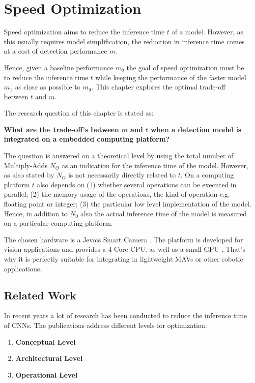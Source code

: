 \chapter{Speed Optimization}
\label{sec:tradeoff}

Speed optimization aims to reduce the inference time $t$ of a model. However, as this usually requires model simplification, the reduction in inference time comes at a cost of detection performance $m$.

Hence, given a baseline performance $m_0$ the goal of speed optimization must be to reduce the inference time $t$ while keeping the performance of the faster model $m_1$ as close as possible to $m_0$. This chapter explores the optimal trade-off between $t$ and $m$.


The research question of this chapter is stated as:

\begin{center}
	\textbf{What are the trade-off's between $m$ and $t$ when a detection model is integrated on a embedded computing platform?}
\end{center}

The question is answered on a theoretical level by using the total number of \ac{Multiply-Adds} $N_O$ as an indication for the inference time of the model. However, as also stated by  $N_O$ is not necessarily directly related to $t$. On a computing platform $t$ also depends on (1) whether several operations can be executed in parallel; (2) the memory usage of the operations, the kind of operation e.g. floating point or integer; (3) the particular low level implementation of the model. Hence, in addition to $N_0$ also the actual inference time of the model is measured on a particular computing platform.

The chosen hardware is a Jevois Smart Camera . The platform is developed for vision applications and provides a 4 Core CPU, as well as a small GPU . That's why it is perfectly suitable for integrating in lightweight \acp{MAV} or other robotic applications.

\section{Related Work}
\label{sec:tradeoff:related_work}

In recent years a lot of research has been conducted to reduce the inference time of \acp{CNN}. The publications address different levels for optimization:
\begin{enumerate}
	\item \textbf{Conceptual Level}
	\item \textbf{Architectural Level}
	\item \textbf{Operational Level}
\end{enumerate}

